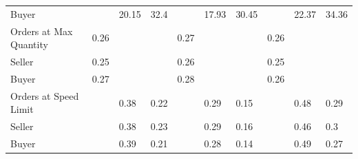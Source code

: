 \begin{tabular}{llllllllll}
 Buyer                  &          & 20.15         & 32.4          &          & 17.93         & 30.45         &           & 22.37         & 34.36         \\
 Orders at Max Quantity & 0.26     &               &               & 0.27     &               &               & 0.26      &               &               \\
 Seller                 & 0.25     &               &               & 0.26     &               &               & 0.25      &               &               \\
 Buyer                  & 0.27     &               &               & 0.28     &               &               & 0.26      &               &               \\
 Orders at Speed Limit  &          & 0.38          & 0.22          &          & 0.29          & 0.15          &           & 0.48          & 0.29          \\
 Seller                 &          & 0.38          & 0.23          &          & 0.29          & 0.16          &           & 0.46          & 0.3           \\
 Buyer                  &          & 0.39          & 0.21          &          & 0.28          & 0.14          &           & 0.49          & 0.27          \\
\hline
\end{tabular}